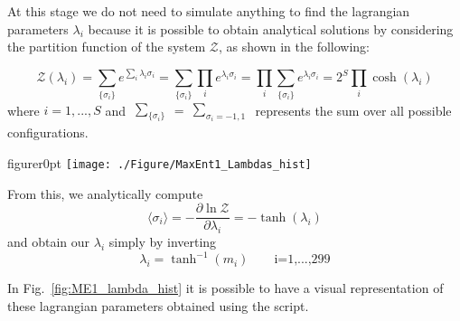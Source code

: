 \documentclass[a4paper,11pt]{article}
\begin{document}
At this stage we do not need to simulate anything to find the lagrangian parameters $\lambda_i$ because it is possible to obtain analytical solutions by considering the partition function of the system $\mathcal{Z}$, as shown in the following:

\begin{equation}
    \mathcal{Z}(\lambda_i) =\sum_{\{\sigma_i\}} e^{\sum_{i} \lambda_i \sigma_i }
                           =\sum_{\{\sigma_i\}} \prod_{i} e^{\lambda_i \sigma_i }
                           =\prod_{i}\sum_{\{\sigma_i\}} e^{\lambda_i \sigma_i } 
                           =2^S \prod_{i} \cosh (\lambda_i)
\end{equation}
where $i=1,...,S$ and $\begin{matrix} \sum_{\{\sigma_i\}} \end{matrix}= \begin{matrix} \sum_{\sigma_i=-1,1} \end{matrix}$ represents the sum over all possible configurations.
\\
\begin{wrapfloat}{figure}{r}{0pt}
    \texttt{[image: ./Figure/MaxEnt1\_Lambdas\_hist]}
    \caption{Histogram of the values of $\lambda_i$ for Max Ent 1. Most of them are between -3 and 3, but there are also few parameters (3\%) that have an infinite value and they are not shown in this figure.}
    \label{fig:ME1_lambda_hist}
\end{wrapfloat}
From this, we analytically compute
\begin{equation}
    \bigl\langle \sigma_i \bigr\rangle = - \frac{\partial \ln \mathcal{Z}}{\partial \lambda_i}=- \tanh(\lambda_i)
\end{equation}
and obtain our $\lambda_i$ simply by inverting
\begin{equation}
    \lambda_i=\tanh^{-1}(m_i)\qquad  \textrm{i=1,...,299}
\end{equation}

In Fig.~\ref{fig:ME1_lambda_hist} it is possible to have a visual representation of these lagrangian parameters obtained using the script.


\end{document}
